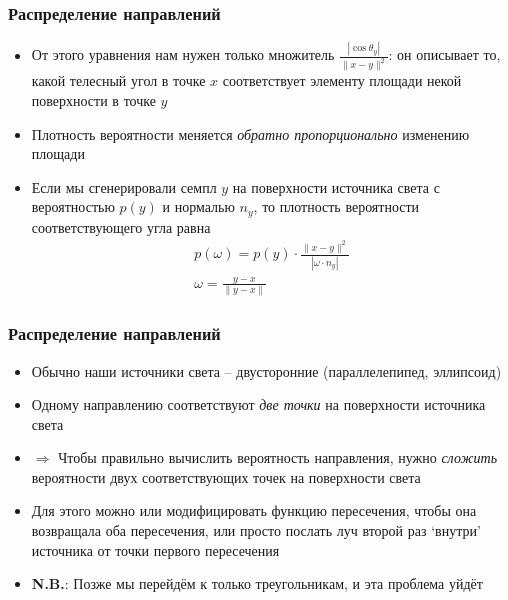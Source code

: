 \documentclass[10pt]{beamer}
\begin{document}
\begin{frame}
\frametitle{Распределение направлений}
\begin{itemize}
\item От этого уравнения нам нужен только множитель \begin{math}\frac{|\cos\theta_y|}{\|x-y\|^2}\end{math}: он описывает то, какой телесный угол в точке \begin{math}x\end{math} соответствует элементу площади некой поверхности в точке \begin{math}y\end{math}
\pause
\item Плотность вероятности меняется \textit{обратно пропорционально} изменению площади
\pause
\item Если мы сгенерировали семпл \begin{math}y\end{math} на поверхности источника света с вероятностью \begin{math}p(y)\end{math} и нормалью \begin{math}n_y\end{math}, то плотность вероятности соответствующего угла равна
\begin{gather*}
p(\omega) = p(y) \cdot \frac{\|x-y\|^2}{|\omega \cdot n_y|} \\
\omega = \frac{y-x}{\|y-x\|}
\end{gather*}
\end{itemize}
\end{frame}

\begin{frame}
\frametitle{Распределение направлений}
\begin{itemize}
\item Обычно наши источники света -- двусторонние (параллелепипед, эллипсоид)
\pause
\item Одному направлению соответствуют \textit{две точки} на поверхности источника света
\pause
\item \begin{math}\Longrightarrow\end{math} Чтобы правильно вычислить вероятность направления, нужно \textit{сложить} вероятности двух соответствующих точек на поверхности света
\pause
\item Для этого можно или модифицировать функцию пересечения, чтобы она возвращала оба пересечения, или просто послать луч второй раз `внутри' источника от точки первого пересечения
\pause
\item \alert{\textbf{N.B.}}: Позже мы перейдём к только треугольникам, и эта проблема уйдёт
\end{itemize}
\end{frame}
\end{document}
